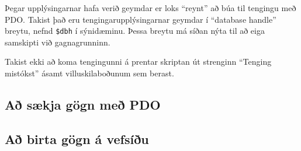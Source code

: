 Þegar upplýsingarnar hafa verið geymdar er loks ``reynt'' að búa til tengingu með PDO. Takist það eru tengingarupplýsingarnar geymdar í  ``database handle'' breytu, nefnd \verb|$dbh| í sýnidæminu. Þessa breytu má síðan nýta til að eiga samskipti við gagnagrunninn.

Takist ekki að koma tengingunni á prentar skriptan út strenginn ``Tenging mistókst'' ásamt villuskilaboðunum sem berast.
\subsection{Að sækja gögn með PDO}
\subsection{Að birta gögn á vefsíðu}